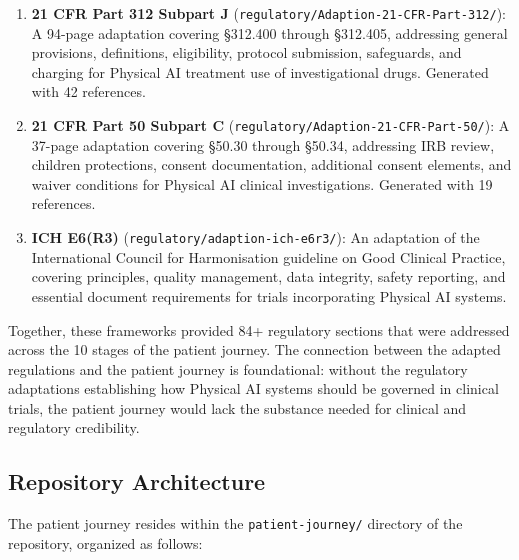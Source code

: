 \documentclass{article}
\begin{document}
\begin{enumerate}[leftmargin=*]
\item \textbf{21 CFR Part 312 Subpart J} (\texttt{regulatory/Adaption-21-CFR-Part-312/}): A 94-page adaptation covering \S312.400 through \S312.405, addressing general provisions, definitions, eligibility, protocol submission, safeguards, and charging for Physical AI treatment use of investigational drugs. Generated with 42 references.

\item \textbf{21 CFR Part 50 Subpart C} (\texttt{regulatory/Adaption-21-CFR-Part-50/}): A 37-page adaptation covering \S50.30 through \S50.34, addressing IRB review, children protections, consent documentation, additional consent elements, and waiver conditions for Physical AI clinical investigations. Generated with 19 references.

\item \textbf{ICH E6(R3)} (\texttt{regulatory/adaption-ich-e6r3/}): An adaptation of the International Council for Harmonisation guideline on Good Clinical Practice, covering principles, quality management, data integrity, safety reporting, and essential document requirements for trials incorporating Physical AI systems.
\end{enumerate}

Together, these frameworks provided 84+ regulatory sections that were addressed across the 10 stages of the patient journey. The connection between the adapted regulations and the patient journey is foundational: without the regulatory adaptations establishing how Physical AI systems should be governed in clinical trials, the patient journey would lack the substance needed for clinical and regulatory credibility.

\subsection{Repository Architecture}

The patient journey resides within the \texttt{patient-journey/} directory of the repository, organized as follows:
\end{document}
